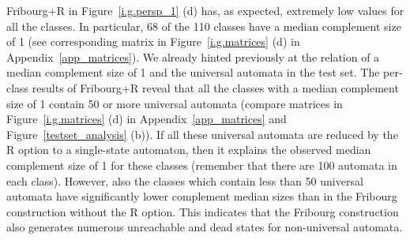Fribourg+R in Figure~\ref{i.g.persp_1} (d) has, as expected, extremely low values for all the classes. In particular, 68 of the 110 classes have a median complement size of 1 (see corresponding matrix in Figure~\ref{i.g.matrices} (d) in Appendix~\ref{app_matrices}). We already hinted previously at the relation of a median complement size of 1 and the universal automata in the \goal{} test set. The per-class results of Fribourg+R reveal that all the classes with a median complement size of 1 contain 50 or more universal automata (compare matrices in Figure~\ref{i.g.matrices} (d) in Appendix~\ref{app_matrices} and Figure~\ref{testset_analysis} (b)). If all these universal automata are reduced by the R option to a single-state automaton, then it explains the observed median complement size of 1 for these classes (remember that there are 100 automata in each class). However, also the classes which contain less than 50 universal automata have significantly lower complement median sizes than in the Fribourg construction without the R option. This indicates that the Fribourg construction also  generates numerous unreachable and dead states for non-universal automata. 


